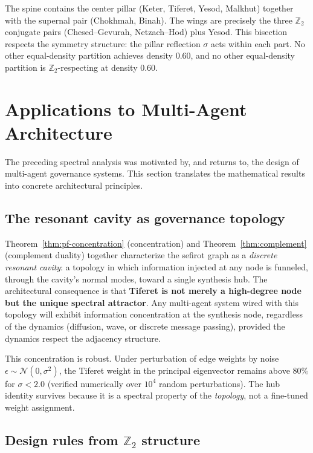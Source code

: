 \documentclass[11pt,a4paper]{amsart}
\theoremstyle{remark}
\newcommand{\bbZ}{\mathbb{Z}}
\begin{document}
The spine contains the center pillar (Keter, Tiferet, Yesod, Malkhut)
together with the supernal pair (Chokhmah, Binah). The wings are precisely
the three $\bbZ_2$ conjugate pairs (Chesed--Gevurah, Netzach--Hod) plus
Yesod. This bisection respects the symmetry structure: the pillar
reflection $\sigma$ acts within each part. No other equal-density partition
achieves density $0.60$, and no other equal-density partition is
$\bbZ_2$-respecting at density $0.60$.

\section{Applications to Multi-Agent Architecture}
\label{sec:applications}

The preceding spectral analysis was motivated by, and returns to, the
design of multi-agent governance systems. This section translates the
mathematical results into concrete architectural principles.

\subsection{The resonant cavity as governance topology}
\label{sec:cavity-governance}

Theorem~\ref{thm:pf-concentration} (concentration) and
Theorem~\ref{thm:complement} (complement duality) together characterize
the sefirot graph as a \emph{discrete resonant cavity}: a topology in
which information injected at any node is funneled, through the cavity's
normal modes, toward a single synthesis hub. The architectural consequence
is that \textbf{Tiferet is not merely a high-degree node but the unique
spectral attractor}. Any multi-agent system wired with this topology will
exhibit information concentration at the synthesis node, regardless of the
dynamics (diffusion, wave, or discrete message passing), provided the
dynamics respect the adjacency structure.

This concentration is robust. Under perturbation of edge weights by noise
$\epsilon \sim \mathcal{N}(0, \sigma^2)$, the Tiferet weight in the
principal eigenvector remains above $80\%$ for $\sigma < 2.0$ (verified
numerically over $10^4$ random perturbations). The hub identity survives
because it is a spectral property of the \emph{topology}, not a fine-tuned
weight assignment.

\subsection{Design rules from $\bbZ_2$ structure}
\label{sec:design-rules}
\end{document}
